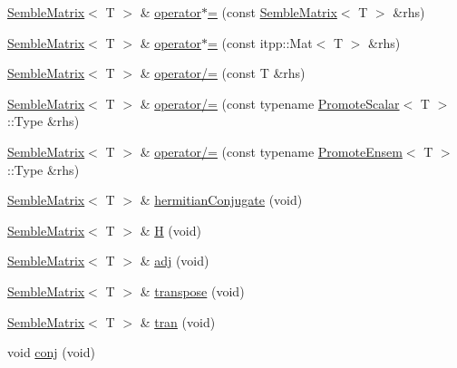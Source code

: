 \begin{DoxyCompactItemize}
\item 
\mbox{\hyperlink{structSEMBLE_1_1SembleMatrix}{Semble\+Matrix}}$<$ T $>$ \& \mbox{\hyperlink{structSEMBLE_1_1SembleMatrix_a44e7f1c8ae0ecd6c4cb43978efbbad4c}{operator$\ast$=}} (const \mbox{\hyperlink{structSEMBLE_1_1SembleMatrix}{Semble\+Matrix}}$<$ T $>$ \&rhs)
\item 
\mbox{\hyperlink{structSEMBLE_1_1SembleMatrix}{Semble\+Matrix}}$<$ T $>$ \& \mbox{\hyperlink{structSEMBLE_1_1SembleMatrix_a977ecfbf1cc215db0349a3dc8b5f6069}{operator$\ast$=}} (const itpp\+::\+Mat$<$ T $>$ \&rhs)
\item 
\mbox{\hyperlink{structSEMBLE_1_1SembleMatrix}{Semble\+Matrix}}$<$ T $>$ \& \mbox{\hyperlink{structSEMBLE_1_1SembleMatrix_ae57419bca4730110675256c1f4adeb8f}{operator/=}} (const T \&rhs)
\item 
\mbox{\hyperlink{structSEMBLE_1_1SembleMatrix}{Semble\+Matrix}}$<$ T $>$ \& \mbox{\hyperlink{structSEMBLE_1_1SembleMatrix_aa93e79177451ce22b75d9eeecd789b4b}{operator/=}} (const typename \mbox{\hyperlink{structSEMBLE_1_1PromoteScalar}{Promote\+Scalar}}$<$ T $>$\+::Type \&rhs)
\item 
\mbox{\hyperlink{structSEMBLE_1_1SembleMatrix}{Semble\+Matrix}}$<$ T $>$ \& \mbox{\hyperlink{structSEMBLE_1_1SembleMatrix_a2ecb3f62dbf02cbf3e0b9dc4828ce844}{operator/=}} (const typename \mbox{\hyperlink{structSEMBLE_1_1PromoteEnsem}{Promote\+Ensem}}$<$ T $>$\+::Type \&rhs)
\item 
\mbox{\hyperlink{structSEMBLE_1_1SembleMatrix}{Semble\+Matrix}}$<$ T $>$ \& \mbox{\hyperlink{structSEMBLE_1_1SembleMatrix_a13321a2e52ce610fd220853564a9cb3c}{hermitian\+Conjugate}} (void)
\item 
\mbox{\hyperlink{structSEMBLE_1_1SembleMatrix}{Semble\+Matrix}}$<$ T $>$ \& \mbox{\hyperlink{structSEMBLE_1_1SembleMatrix_a560e987e3d3151b9d5c31b4bb919983a}{H}} (void)
\item 
\mbox{\hyperlink{structSEMBLE_1_1SembleMatrix}{Semble\+Matrix}}$<$ T $>$ \& \mbox{\hyperlink{structSEMBLE_1_1SembleMatrix_a1005b8d94ad7731fe6826fd614203703}{adj}} (void)
\item 
\mbox{\hyperlink{structSEMBLE_1_1SembleMatrix}{Semble\+Matrix}}$<$ T $>$ \& \mbox{\hyperlink{structSEMBLE_1_1SembleMatrix_a7e0c35ec29e619bde2f07fe9cbac56c6}{transpose}} (void)
\item 
\mbox{\hyperlink{structSEMBLE_1_1SembleMatrix}{Semble\+Matrix}}$<$ T $>$ \& \mbox{\hyperlink{structSEMBLE_1_1SembleMatrix_a1f306991f4b4e22697c8b1c5e1fc9d66}{tran}} (void)
\item 
void \mbox{\hyperlink{structSEMBLE_1_1SembleMatrix_ae1a1e21202bf3bb9198e8f769a3c9697}{conj}} (void)
\end{DoxyCompactItemize}
